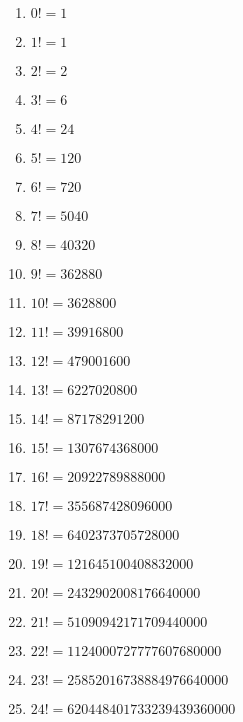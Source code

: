\begin{enumerate}
\item $0! = 1$

\item $1! = 1$

\item $2! = 2$

\item $3! = 6$

\item $4! = 24$

\item $5! = 120$

\item $6! = 720$

\item $7! = 5040$

\item $8! = 40320$

\item $9! = 362880$

\item $10! = 3628800$

\item $11! = 39916800$

\item $12! = 479001600$

\item $13! = 6227020800$

\item $14! = 87178291200$

\item $15! = 1307674368000$

\item $16! = 20922789888000$

\item $17! = 355687428096000$

\item $18! = 6402373705728000$

\item $19! = 121645100408832000$

\item $20! = 2432902008176640000$

\item $21! = 51090942171709440000$

\item $22! = 1124000727777607680000$

\item $23! = 25852016738884976640000$

\item $24! = 620448401733239439360000$


\end{enumerate}
